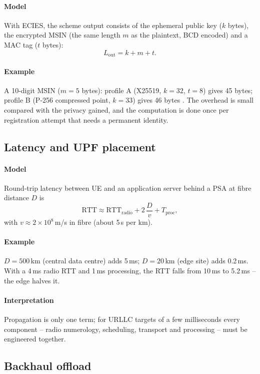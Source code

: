 \documentclass[11pt,a4paper]{article}
\begin{document}
\paragraph{Model} With ECIES, the scheme output consists of the ephemeral public key ($k$ bytes), the encrypted MSIN (the same
length $m$ as the plaintext, BCD encoded) and a MAC tag ($t$ bytes):
\begin{equation}\label{eq:suci}
  L_{\mathrm{out}} = k + m + t .
\end{equation}
\paragraph{Example} A 10-digit MSIN ($m = 5$ bytes): profile A (X25519, $k = 32$, $t = 8$) gives 45 bytes; profile B (P-256
compressed point, $k = 33$) gives 46 bytes \cite{ts33501}. The overhead is small compared with the privacy gained, and the
computation is done once per registration attempt that needs a permanent identity.

\subsection{Latency and UPF placement}\label{sec:rtt}
\paragraph{Model} Round-trip latency between UE and an application server behind a PSA at fibre distance $D$ is
\begin{equation}\label{eq:rtt}
  \mathrm{RTT} \approx \mathrm{RTT}_{\mathrm{radio}} + 2\,\frac{D}{v} + T_{\mathrm{proc}},
\end{equation}
with $v \approx 2\times10^8$\,m/s in fibre (about 5\,\textmu s per km).
\paragraph{Example} $D = 500$\,km (central data centre) adds 5\,ms; $D = 20$\,km (edge site) adds 0.2\,ms. With a 4\,ms radio RTT
and 1\,ms processing, the RTT falls from 10\,ms to 5.2\,ms -- the edge halves it.
\paragraph{Interpretation} Propagation is only one term; for URLLC targets of a few milliseconds every component -- radio
numerology, scheduling, transport and processing -- must be engineered together.

\subsection{Backhaul offload}\label{sec:offload}
\end{document}
